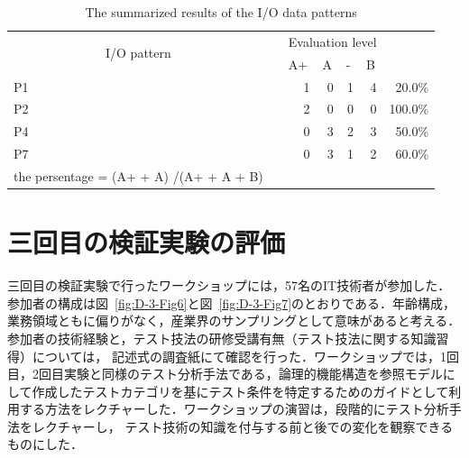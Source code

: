\documentclass[a4paper,12pt]{jreport}
\begin{document}
\begin{table}[htbp]
  \centering
  \caption{The summarized results of the I/O data patterns}
    \begin{tabular}{lrrrrrr}
\cline{1-6}    \multicolumn{1}{|c}{\multirow{2}[4]{*}{I/O pattern}} & \multicolumn{1}{r|}{} & \multicolumn{4}{c|}{Evaluation level} &  \bigstrut\\
\cline{3-6}    \multicolumn{1}{|c}{} & \multicolumn{1}{r|}{} & \multicolumn{1}{l|}{A+} & \multicolumn{1}{l|}{A} & \multicolumn{1}{l|}{-} & \multicolumn{1}{l|}{B} &  \bigstrut\\
\cline{1-6}    \multicolumn{1}{|l|}{P1} & \multicolumn{1}{r|}{} & \multicolumn{1}{r|}{1} & \multicolumn{1}{r|}{0} & \multicolumn{1}{r|}{1} & \multicolumn{1}{r|}{4} & 20.0\% \bigstrut\\
\cline{1-6}    \multicolumn{1}{|l|}{P2} & \multicolumn{1}{r|}{} & \multicolumn{1}{r|}{2} & \multicolumn{1}{r|}{0} & \multicolumn{1}{r|}{0} & \multicolumn{1}{r|}{0} & 100.0\% \bigstrut\\
\cline{1-6}    \multicolumn{1}{|l|}{P4} & \multicolumn{1}{r|}{} & \multicolumn{1}{r|}{0} & \multicolumn{1}{r|}{3} & \multicolumn{1}{r|}{2} & \multicolumn{1}{r|}{3} & 50.0\% \bigstrut\\
\cline{1-6}    \multicolumn{1}{|l|}{P7} & \multicolumn{1}{r|}{} & \multicolumn{1}{r|}{0} & \multicolumn{1}{r|}{3} & \multicolumn{1}{r|}{1} & \multicolumn{1}{r|}{2} & 60.0\% \bigstrut\\
\cline{1-6}    the persentage = (A+  +  A) /(A+  +  A + B)  &       &       &       &       &       &  \bigstrut[t]\\
    \end{tabular}%
  \label{tbl:D-3-tbl10}%
\end{table}%


\section{三回目の検証実験の評価}

三回目の検証実験で行ったワークショップには，57名のIT技術者が参加した．参加者の構成は図~\ref{fig:D-3-Fig6}と図~\ref{fig:D-3-Fig7}のとおりである．年齢構成，業務領域ともに偏りがなく，産業界のサンプリングとして意味があると考える．参加者の技術経験と，テスト技法の研修受講有無（テスト技法に関する知識習得）については， 記述式の調査紙にて確認を行った．ワークショップでは，1回目，2回目実験と同様のテスト分析手法である，論理的機能構造を参照モデルにして作成したテストカテゴリを基にテスト条件を特定するためのガイドとして利用する方法をレクチャーした．ワークショップの演習は，段階的にテスト分析手法をレクチャーし， テスト技術の知識を付与する前と後での変化を観察できるものにした．
\end{document}
